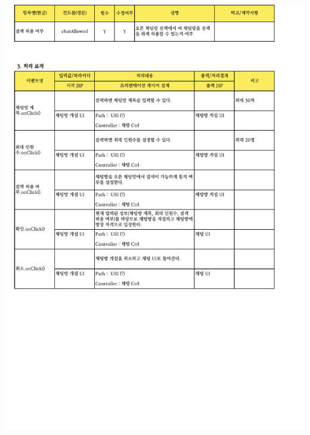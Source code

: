 {{{{{{{{{{{{{{{{{{{{{{{{{{{{{{{{{{{{{{{{{{{{{{{{{{{{{{{{{{{{{{{{{{\includegraphics[width=20cm]{./Figure/Analysis/Display/chat/chat_05.pdf} \\
}}}}}}}}}}}}}}}}}}}}}}}}}}}}}}}}}}}}}}}}}}}}}}}}}}}}}}}}}}}}}}}}}}
